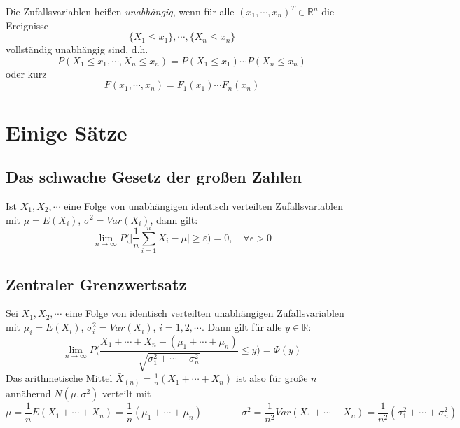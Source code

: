 \documentclass[a4paper, 11pt, accentcolor = tud3b]{tudreport}
\newcommand{\R}{\ensuremath{\mathbb{R}}}
\newcommand{\Var}{\ensuremath{\textit{Var}}}
\begin{document}
                Die Zufallsvariablen heißen \textit{unabhängig}, wenn für alle \( (x_1, \cdots, x_n)^T \in \R^n \) die Ereignisse \[ \{ X_1 \leq x_1 \}, \cdots, \{ X_n \leq x_n \} \] vollständig unabhängig sind, d.h. \[ P(X_1 \leq x_1, \cdots, X_n \leq x_n) = P(X_1 \leq x_1) \cdots P(X_n \leq x_n) \] oder kurz \[ F(x_1, \cdots, x_n) = F_1(x_1) \cdots F_n(x_n) \]

        \section{Einige Sätze}
            \subsection{Das schwache Gesetz der großen Zahlen}
                Ist \( X_1, X_2, \cdots \) eine Folge von unabhängigen identisch verteilten Zufallsvariablen mit \( \mu = E(X_i) \), \( \sigma^2 = \Var(X_i) \), dann gilt:
                \begin{equation*}
	                \lim\limits_{n \rightarrow \infty} P\Bigg( \bigg\lvert\frac{1}{n} \sum_{i = 1}^{n} X_i - \mu\bigg\rvert \geq \varepsilon \Bigg) = 0, \quad \forall \epsilon > 0
                \end{equation*}

            \subsection{Zentraler Grenzwertsatz}
                Sei \( X_1, X_2, \cdots \) eine Folge von identisch verteilten unabhängigen Zufallsvariablen mit \( \mu_i = E(X_i) \), \( \sigma_i^2 = \Var(X_i) \), \( i = 1, 2, \cdots \). Dann gilt für alle \( y \in \R \):
                \begin{equation*}
	                \lim\limits_{n \rightarrow \infty} P\Bigg( \frac{X_1 + \cdots + X_n - (\mu_1 + \cdots + \mu_n)}{\sqrt{\sigma_1^2 + \cdots + \sigma_n^2}} \leq y \Bigg) = \Phi(y)
                \end{equation*}
                Das arithmetische Mittel \( \bar{X}_{(n)} = \frac{1}{n} (X_1 + \cdots + X_n) \) ist also für große \(n\) annähernd \( N(\mu, \sigma^2) \) verteilt mit
                \begin{equation*}
	                \mu = \frac{1}{n} E(X_1 + \cdots + X_n) = \frac{1}{n} (\mu_1 + \cdots + \mu_n) \qquad\qquad \sigma^2 = \frac{1}{n^2} \Var(X_1 + \cdots + X_n) = \frac{1}{n^2} (\sigma_1^2 + \cdots + \sigma_n^2)
                \end{equation*}
                
\end{document}
